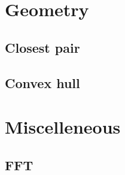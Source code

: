 \documentclass[10pt,landscape,a4paper,twocolumn]{article}
\begin{document}
\section{Geometry}
\subsection{Closest pair}


\subsection{Convex hull}


%


\section{Miscelleneous}
%
%
%
%
%
%
%

\subsection{FFT}


%
\end{document}
